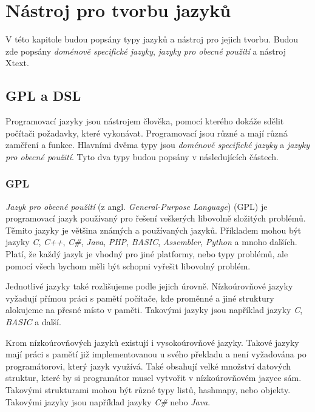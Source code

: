 \chapter{Nástroj pro tvorbu jazyků}

V této kapitole budou popsány typy jazyků a nástroj pro jejich tvorbu. Budou zde popsány \textit{doménově specifické jazyky}, \textit{jazyky pro obecné použití} a nástroj Xtext.

\section{GPL a DSL}

Programovací jazyky jsou nástrojem člověka, pomocí kterého dokáže sdělit počítači požadavky, které vykonávat. Programovací jsou různé a mají různá zaměření a funkce. Hlavními dvěma typy jsou \textit{doménově specifické jazyky} a \textit{jazyky pro obecné použití}. Tyto dva typy budou popsány v následujících částech. 

\subsection{GPL}

\textit{Jazyk pro obecné použití} (z angl. \textit{General-Purpose Language}) (GPL) je programovací jazyk používaný pro řešení veškerých libovolně složitých problémů. Těmito jazyky je většina známých a používaných jazyků. Příkladem mohou být jazyky \textit{C}, \textit{C++}, \textit{C\#}, \textit{Java}, \textit{PHP}, \textit{BASIC}, \textit{Assembler}, \textit{Python} a mnoho dalších. Platí, že každý jazyk je vhodný pro jiné platformy, nebo typy problémů, ale pomocí všech bychom měli být schopni vyřešit libovolný problém.

Jednotlivé jazyky také rozlišujeme podle jejich úrovně. Nízkoúrovňové jazyky vyžadují přímou práci s pamětí počítače, kde proměnné a jiné struktury alokujeme na přesné místo v paměti. Takovými jazyky jsou například jazyky \textit{C}, \textit{BASIC} a další.

Krom nízkoúrovňových jazyků existují i vysokoúrovňové jazyky. Takové jazyky mají práci s pamětí již implementovanou u svého překladu a není vyžadována po programátorovi, který jazyk využívá. Také obsahují velké množství datových struktur, které by si programátor musel vytvořit v nízkoúrovňovém jazyce sám. Takovými strukturami mohou být různé typy listů, hashmapy, nebo objekty. Takovými jazyky jsou například jazyky \textit{C\#} nebo \textit{Java}.

